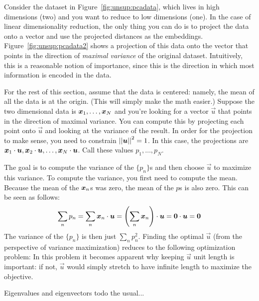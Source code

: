 
Consider the dataset in Figure~\ref{fig:unsup:pcadata}, which lives in
high dimensions (two) and you want to reduce to low dimensions (one).
In the case of linear dimensionality reduction, the only thing you can
do is to project the data onto a vector and use the projected
distances as the embeddings.  Figure~\ref{fig:unsup:pcadata2} shows a
projection of this data onto the vector that points in the direction
of \emph{maximal variance} of the original dataset.  Intuitively, this
is a reasonable notion of importance, since this is the direction in
which most information is encoded in the data.

For the rest of this section, assume that the data is centered:
namely, the mean of all the data is at the origin.  (This will simply
make the math easier.)  Suppose the two dimensional data is ${\boldsymbol{x}}_1,
\dots, {\boldsymbol{x}}_N$ and you're looking for a vector $\vec u$ that points in
the direction of maximal variance.  You can compute this by projecting
each point onto $\vec u$ and looking at the variance of the result.
In order for the projection to make sense, you need to constrain
$\left\vert\left\vert \boldsymbol{u} \right\vert\right\vert^2 = 1$.  In this case, the projections are
${\boldsymbol{x}}_1 \cdot \boldsymbol{u}, {\boldsymbol{x}}_2 \cdot \boldsymbol{u}, \dots, {\boldsymbol{x}}_N \cdot \boldsymbol{u}$.  Call these values $p_1, \dots, p_N$.

The goal is to compute the variance of the $\{p_n\}$s and then choose
$\vec u$ to maximize this variance.  To compute the variance, you
first need to compute the mean.  Because the mean of the ${\boldsymbol{x}}_n$s was
zero, the mean of the $p$s is also zero.  This can be seen as follows:
%
\begin{align}
  \sum_n p_n
  = \sum_n {\boldsymbol{x}}_n \cdot \boldsymbol{u} 
  = \left( \sum_n {\boldsymbol{x}}_n \right) \cdot \boldsymbol{u} 
  = \boldsymbol{0} \cdot \boldsymbol{u} = \boldsymbol{0}
\end{align}
%
The variance of the $\{p_n\}$ is then just $\sum_n p_n^2$.  Finding
the optimal $\vec u$ (from the perspective of variance maximization)
reduces to the following optimization problem:
%
%
In this problem it becomes apparent why keeping $\vec u$ unit length
is important: if not, $\vec u$ would simply stretch to have infinite
length to maximize the objective.

\begin{mathreview}{Eigenvalues and eigenvectors}
  todo the usual...
\end{mathreview}

